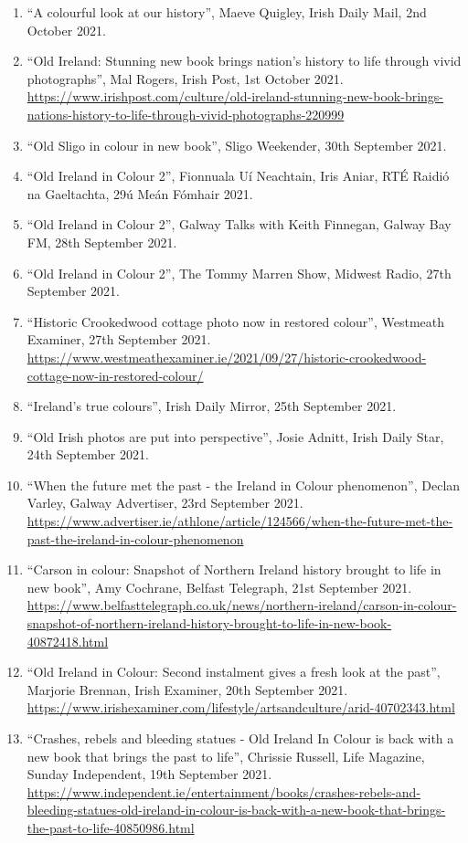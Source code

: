 \documentclass[10pt,a4paper]{res} %
\begin{document}
\begin{resume}
{\begin{enumerate}
\item ``A colourful look at our history'', Maeve Quigley, Irish Daily Mail, 2nd October 2021.
\item ``Old Ireland: Stunning new book brings nation's history to life through vivid photographs'', Mal Rogers, Irish Post, 1st October 2021. \url{https://www.irishpost.com/culture/old-ireland-stunning-new-book-brings-nations-history-to-life-through-vivid-photographs-220999}
\item ``Old Sligo in colour in new book'', Sligo Weekender, 30th September 2021.
\item ``Old Ireland in Colour 2'', Fionnuala U\'{i} Neachtain, Iris Aniar, RT\'{E} Raidi\'{o} na Gaeltachta, 29\'{u} Me\'{a}n F\'{o}mhair 2021.
\item ``Old Ireland in Colour 2'', Galway Talks with Keith Finnegan, Galway Bay FM, 28th September 2021.
\item ``Old Ireland in Colour 2'', The Tommy Marren Show, Midwest Radio, 27th September 2021.
\item ``Historic Crookedwood cottage photo now in restored colour'', Westmeath Examiner, 27th September 2021. \url{https://www.westmeathexaminer.ie/2021/09/27/historic-crookedwood-cottage-now-in-restored-colour/}
\item ``Ireland's true colours'', Irish Daily Mirror, 25th September 2021.
\item ``Old Irish photos are put into perspective'', Josie Adnitt, Irish Daily Star, 24th September 2021.
\item ``When the future met the past - the Ireland in Colour phenomenon'', Declan Varley, Galway Advertiser, 23rd September 2021. \url{https://www.advertiser.ie/athlone/article/124566/when-the-future-met-the-past-the-ireland-in-colour-phenomenon}
\item ``Carson in colour: Snapshot of Northern Ireland history brought to life in new book'', Amy Cochrane, Belfast Telegraph, 21st September 2021. \url{https://www.belfasttelegraph.co.uk/news/northern-ireland/carson-in-colour-snapshot-of-northern-ireland-history-brought-to-life-in-new-book-40872418.html}
\item ``Old Ireland in Colour: Second instalment gives a fresh look at the past'', Marjorie Brennan, Irish Examiner, 20th September 2021. \url{https://www.irishexaminer.com/lifestyle/artsandculture/arid-40702343.html}
\item ``Crashes, rebels and bleeding statues - Old Ireland In Colour is back with a new book that brings the past to life'', Chrissie Russell, Life Magazine, Sunday Independent, 19th September 2021. \url{https://www.independent.ie/entertainment/books/crashes-rebels-and-bleeding-statues-old-ireland-in-colour-is-back-with-a-new-book-that-brings-the-past-to-life-40850986.html}

\end{enumerate}}
\end{resume}
\end{document}
